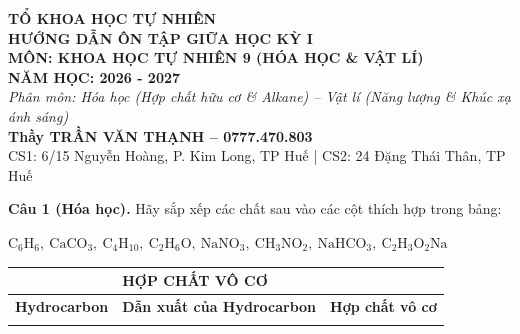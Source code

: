 \documentclass{article}
\begin{document}

\begin{center}
\vspace*{0.6cm}
{\fontsize{24}{30}\selectfont \textbf{TỔ KHOA HỌC TỰ NHIÊN}}\\[0.6cm]
{\fontsize{34}{42}\selectfont \textbf{\color{brandGreen}HƯỚNG DẪN ÔN TẬP GIỮA HỌC KỲ I}}\\[0.4cm]
{\fontsize{28}{36}\selectfont \textbf{MÔN: KHOA HỌC TỰ NHIÊN 9 (HÓA HỌC \& VẬT LÍ)}}\\[0.4cm]
{\fontsize{22}{28}\selectfont \textbf{NĂM HỌC: 2026 - 2027}}\\[0.8cm]
{\fontsize{24}{32}\selectfont \textit{Phân môn: Hóa học (Hợp chất hữu cơ \& Alkane) -- Vật lí (Năng lượng \& Khúc xạ ánh sáng)}}\\[1.0cm]
{\fontsize{24}{30}\selectfont \textbf{\color{brandRed}Thầy TRẦN VĂN THẠNH -- 0777.470.803}}\\[0.3cm]
{\fontsize{20}{26}\selectfont CS1: 6/15 Nguyễn Hoàng, P. Kim Long, TP Huế \quad | \quad CS2: 24 Đặng Thái Thân, TP Huế}
\end{center}
\newpage


\fontsize{24}{32}\selectfont
\textbf{Câu 1 (Hóa học).} Hãy sắp xếp các chất sau vào các cột thích hợp trong bảng:\\
\centerline{$\text{C}_6\text{H}_6,\ \text{CaCO}_3,\ \text{C}_4\text{H}_{10},\ \text{C}_2\text{H}_6\text{O},\ \text{NaNO}_3,\ \text{CH}_3\text{NO}_2,\ \text{NaHCO}_3,\ \text{C}_2\text{H}_3\text{O}_2\text{Na}$}
\vspace{12pt}

\begin{center}
\begin{tabular}{|>{\centering\arraybackslash}p{8.5cm}|>{\centering\arraybackslash}p{9.0cm}|>{\centering\arraybackslash}p{8.5cm}|}
\hline
\multicolumn{2}{|c|}{\textbf{HỢP CHẤT HỮU CƠ}} & \textbf{HỢP CHẤT VÔ CƠ}\\[4pt]
\hline
\textbf{Hydrocarbon} & \textbf{Dẫn xuất của Hydrocarbon} & \textbf{Hợp chất vô cơ}\\[4pt]
\hline
\vspace{35pt} & \vspace{35pt} & \vspace{35pt}\\
\hline
\end{tabular}
\end{center}
\vspace*{\fill}
\newpage
\end{document}
